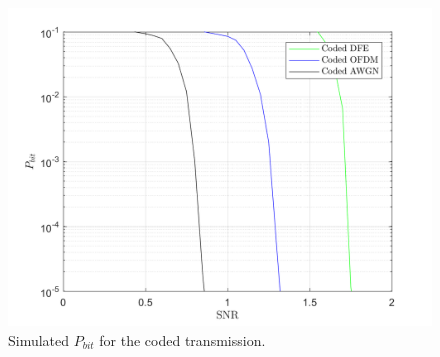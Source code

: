 \documentclass[a4paper, 12pt]{report}
\begin{document}
\begin{figure}[H]
	\centering
	\includegraphics[width=14cm]{coded}
	\caption{Simulated $P_{bit}$ for the coded transmission.}\label{coded}
\end{figure}



%	
%		
%	
%		
%		
%	
\end{document}
